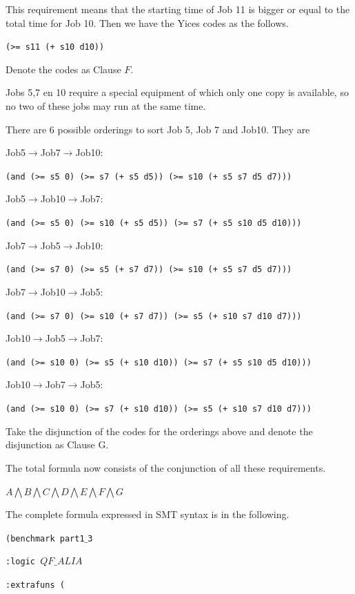 \documentclass[11pt]{article}
\begin{document}
{\begin{description}
  This requirement means that the starting time of Job 11 is bigger or equal to the total time for Job 10.
  Then we have the Yices codes as the follows.
  \begin{center}
  {\tt (>= s11 (+ s10 d10))}
  \end{center}
  Denote the codes as Clause $F$.
  \item[Requirement 9:] Jobs 5,7 en 10 require a special equipment of which only one copy is available, so no two of these jobs may run at the same time.

  There are 6 possible orderings to sort Job 5, Job 7 and Job10. They are

  Job5$\rightarrow$Job7$\rightarrow$Job10:

  {\tt (and (>= s5 0) (>= s7 (+ s5 d5)) (>= s10 (+ s5 s7 d5 d7)))}

  Job5$\rightarrow$Job10$\rightarrow$Job7:

  {\tt (and (>= s5 0) (>= s10 (+ s5 d5)) (>= s7 (+ s5 s10 d5 d10)))}

  Job7$\rightarrow$Job5$\rightarrow$Job10:

  {\tt (and (>= s7 0) (>= s5 (+ s7 d7)) (>= s10 (+ s5 s7 d5 d7)))}

  Job7$\rightarrow$Job10$\rightarrow$Job5:

  {\tt (and (>= s7 0) (>= s10 (+ s7 d7)) (>= s5 (+ s10 s7 d10 d7)))}

  Job10$\rightarrow$Job5$\rightarrow$Job7:

  {\tt (and (>= s10 0) (>= s5 (+ s10 d10)) (>= s7 (+ s5 s10 d5 d10)))}

  Job10$\rightarrow$Job7$\rightarrow$Job5:

  {\tt (and (>= s10 0) (>= s7 (+ s10 d10)) (>= s5 (+ s10 s7 d10 d7)))}

  Take the disjunction of the codes for the orderings above and denote the disjunction as Clause G.
\end{description}
The total formula now consists of the conjunction of all these requirements.
\begin{center}
$A \bigwedge B \bigwedge C \bigwedge D \bigwedge E \bigwedge F \bigwedge G$
\end{center}
The complete formula expressed in SMT syntax is in the following.

{\footnotesize

{\tt (benchmark part1$\_$3}

{\tt :logic $QF\_ALIA$}

{\tt :extrafuns (}

}}
\end{document}
